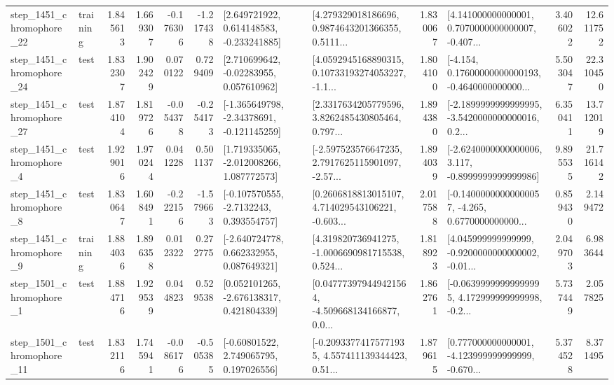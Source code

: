 \begin{tabular}{llrrrrllrlrr}
 step\_1451\_chromophore\_22 &  training &      1.845613 &    1.669307 &     -0.176306 & -1.217438 &    [2.649721922, 0.614148583, -0.233241885] &  [4.279329018186696, 0.9874643201366355, 0.5111... &       1.830067 &  [4.141000000000001, 0.7070000000000007, -0.407... &            3.406022 &         12.611752 \\
 step\_1451\_chromophore\_24 &      test &      1.832307 &    1.902429 &      0.070122 &  0.729409 &     [2.710699642, -0.02283955, 0.057610962] &  [4.0592945168890315, 0.10733193274053227, -1.1... &       1.804100 &  [-4.154, 0.17600000000000193, -0.4640000000000... &            5.503047 &         22.310450 \\
 step\_1451\_chromophore\_27 &      test &      1.874104 &    1.819726 &     -0.054378 & -0.254173 &   [-1.365649798, -2.34378691, -0.121145259] &  [2.3317634205779596, 3.8262485430805464, 0.797... &       1.894380 &  [-2.1899999999999995, -3.5420000000000016, 0.2... &            6.350411 &         13.712019 \\
  step\_1451\_chromophore\_4 &      test &      1.929016 &    1.970244 &      0.041228 &  0.501137 &    [1.719335065, -2.012008266, 1.087772573] &  [-2.597523576647235, 2.7917625115901097, -2.57... &       1.894039 &  [-2.6240000000000006, 3.117, -0.8999999999999986] &            9.895535 &         21.716142 \\
  step\_1451\_chromophore\_8 &      test &      1.830647 &    1.608491 &     -0.222156 & -1.579663 &     [-0.107570555, -2.7132243, 0.393554757] &  [0.2606818813015107, 4.714029543106221, -0.603... &       2.017588 &  [-0.14000000000000057, -4.265, 0.6770000000000... &            0.859430 &          2.149472 \\
  step\_1451\_chromophore\_9 &  training &      1.884036 &    1.896358 &      0.012322 &  0.272775 &    [-2.640724778, 0.662332955, 0.087649321] &  [4.319820736941275, -1.0006690981715538, 0.524... &       1.818923 &  [4.045999999999999, -0.9200000000000002, -0.01... &            2.049703 &          6.983644 \\
  step\_1501\_chromophore\_1 &      test &      1.884716 &    1.929539 &      0.044823 &  0.529538 &    [0.052101265, -2.676138317, 0.421804339] &  [0.047773979449421564, -4.509668134166877, 0.0... &       1.862761 &  [-0.06399999999999995, 4.172999999999998, -0.2... &            5.737449 &          2.057825 \\
 step\_1501\_chromophore\_11 &      test &      1.832116 &    1.745941 &     -0.086176 & -0.505385 &     [-0.60801522, 2.749065795, 0.197026556] &  [-0.20933774175771935, 4.557411139344423, 0.51... &       1.879615 &  [0.777000000000001, -4.123999999999999, -0.670... &            5.374528 &          8.371495 \\

\end{tabular}
